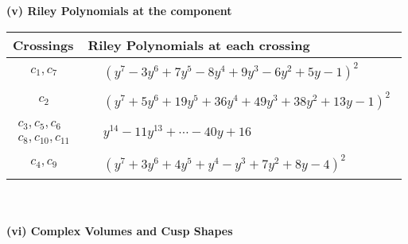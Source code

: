 \documentclass[1p]{elsarticle_modified}
\theoremstyle{definition}
\begin{document}
\newpage\renewcommand{\arraystretch}{1}
\flushleft \textbf{(v) Riley Polynomials at the component}\newline \\
\begin{tabular}{m{50pt}|m{274pt}}
Crossings & \hspace{64pt}Riley Polynomials at each crossing \\
\hline $$\begin{aligned}c_{1},c_{7}\end{aligned}$$&$\begin{aligned}
&(y^7-3 y^6+7 y^5-8 y^4+9 y^3-6 y^2+5 y-1)^2
\end{aligned}$\\
\hline $$\begin{aligned}c_{2}\end{aligned}$$&$\begin{aligned}
&(y^7+5 y^6+19 y^5+36 y^4+49 y^3+38 y^2+13 y-1)^2
\end{aligned}$\\
\hline $$\begin{aligned}c_{3},c_{5},c_{6}\\c_{8},c_{10},c_{11}\end{aligned}$$&$\begin{aligned}
&y^{14}-11 y^{13}+\cdots-40 y+16
\end{aligned}$\\
\hline $$\begin{aligned}c_{4},c_{9}\end{aligned}$$&$\begin{aligned}
&(y^7+3 y^6+4 y^5+y^4- y^3+7 y^2+8 y-4)^2
\end{aligned}$\\
\hline
\end{tabular}\\~\\
\newpage\flushleft \textbf{(vi) Complex Volumes and Cusp Shapes}
\end{document}
